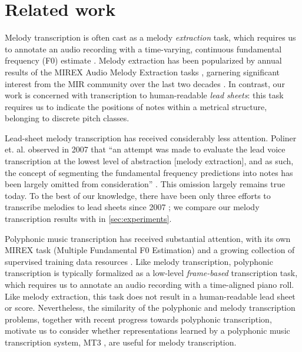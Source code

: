 \section{Related work}\label{sec:related}


Melody transcription is often cast as a melody \emph{extraction} task, which requires us to annotate an audio recording with a time-varying, continuous fundamental frequency (F0) estimate \cite{goto2004real}. Melody extraction has been popularized by annual results of the MIREX Audio Melody Extraction tasks \cite{downie2014ten}, garnering significant interest from the MIR community over the last two decades \cite{salamon2014melody,rao2022melody}. In contrast, our work is concerned with transcription to human-readable \emph{lead sheets}: this task requires us to indicate the positions of notes within a metrical structure, belonging to discrete pitch classes.

Lead-sheet melody transcription has received considerably less attention. Poliner et. al. observed in 2007 that ``an attempt was made to evaluate the lead voice transcription at the lowest level of abstraction [melody extraction], and as such, the concept of segmenting the fundamental frequency predictions into notes has been largely omitted from consideration'' \cite{poliner2007melody}. This omission largely remains true today. To the best of our knowledge, there have been only three efforts to transcribe melodies to lead sheets since 2007 \cite{ryynanen2008automatic,weil2009automatic,laaksonen2014automatic}; we compare our melody transcription results with \cite{ryynanen2008automatic} in \cref{sec:experiments}.

Polyphonic music transcription has received substantial attention, with its own MIREX task (Multiple Fundamental F0 Estimation) and a growing collection of supervised training data resources \cite{benetos2013automatic,thickstun2017learning,hawthorne2019enabling,manilow2019cutting}. Like melody transcription, polyphonic transcription is typically formalized as a low-level \emph{frame-based} transcription task, which requires us to annotate an audio recording with a time-aligned piano roll. Like melody extraction, this task does not result in a human-readable lead sheet or score. Nevertheless, the similarity of the polyphonic and melody transcription problems, together with recent progress towards polyphonic transcription, motivate us to consider whether representations learned by a polyphonic music transcription system, MT3 \cite{gardner2021mt3}, are useful for melody transcription.


